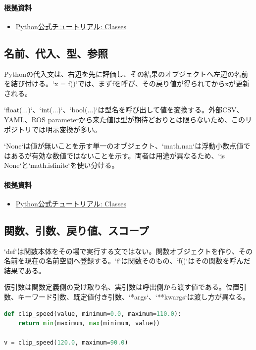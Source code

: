 \documentclass[a4paper,11pt]{article}
\begin{document}
\paragraph{根拠資料}
\begin{itemize}[leftmargin=1.6em]
\item \href{https://docs.python.org/3/tutorial/classes.html}{Python公式チュートリアル: Classes}
\end{itemize}

\subsection{名前、代入、型、参照}
Pythonの代入文は、右辺を先に評価し、その結果のオブジェクトへ左辺の名前を結び付ける。`x = f()`では、まずfを呼び、その戻り値が得られてからxが更新される。


`float(...)`、`int(...)`、`bool(...)`は型名を呼び出して値を変換する。外部CSV、YAML、ROS parameterから来た値は型が期待どおりとは限らないため、このリポジトリでは明示変換が多い。


`None`は値が無いことを示す単一のオブジェクト、`math.nan`は浮動小数点値ではあるが有効な数値ではないことを示す。両者は用途が異なるため、`is None`と`math.isfinite`を使い分ける。

\paragraph{根拠資料}
\begin{itemize}[leftmargin=1.6em]
\item \href{https://docs.python.org/3/tutorial/classes.html}{Python公式チュートリアル: Classes}
\end{itemize}

\subsection{関数、引数、戻り値、スコープ}
`def`は関数本体をその場で実行する文ではない。関数オブジェクトを作り、その名前を現在の名前空間へ登録する。`f`は関数そのもの、`f()`はその関数を呼んだ結果である。


仮引数は関数定義側の受け取り名、実引数は呼出側から渡す値である。位置引数、キーワード引数、既定値付き引数、`*args`、`**kwargs`は渡し方が異なる。


\begin{lstlisting}[language=python]
def clip_speed(value, minimum=0.0, maximum=110.0):
    return min(maximum, max(minimum, value))

v = clip_speed(120.0, maximum=90.0)
\end{lstlisting}
\end{document}
